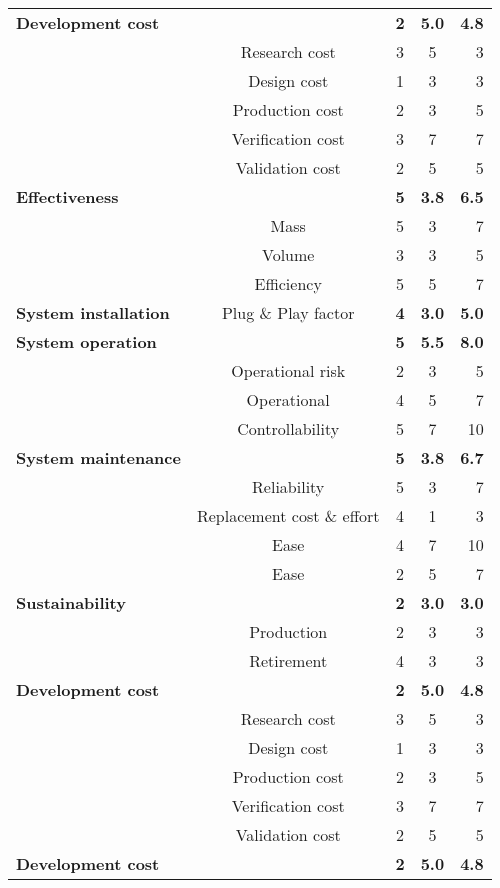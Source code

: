 \begin{center}
\begin{scriptsize}
\begin{longtable}[c]{lcccr}
 \textbf{Development cost} & & \textbf{2} & \textbf{5.0} & \textbf{4.8} \\
  & Research cost & 3 & 5 & 3 \\
  & Design cost & 1 & 3 & 3 \\
  & Production cost & 2 & 3 & 5 \\
  & Verification cost & 3 & 7 & 7 \\
  & Validation cost & 2 & 5 & 5 \\ \hline
 \textbf{Effectiveness} & & \textbf{5} & \textbf{3.8} & \textbf{6.5 } \\
  & Mass & 5 & 3 & 7 \\
  & Volume & 3 & 3 & 5 \\
  & Efficiency & 5 & 5 & 7 \\ \hline
 \textbf{System installation} & Plug \& Play factor & \textbf{4} & \textbf{3.0} & \textbf{5.0} \\ \hline
 \textbf{System operation} & & \textbf{5} & \textbf{5.5} & \textbf{8.0} \\
  & Operational risk & 2 & 3 & 5 \\
  & Operational  & 4 & 5 & 7 \\
  & Controllability & 5 & 7 & 10 \\\hline
 \textbf{System maintenance} & & \textbf{5} & \textbf{3.8} & \textbf{6.7} \\
  & Reliability & 5 & 3 & 7 \\
  & Replacement cost \& effort & 4 & 1 & 3 \\
  & Ease  & 4 & 7 & 10 \\
  & Ease  & 2 & 5 & 7 \\\hline
 \textbf{Sustainability} & & \textbf{2} & \textbf{3.0} & \textbf{3.0} \\
  & Production & 2 & 3 & 3 \\
  & Retirement & 4 & 3 & 3 \\ \hline
  \textbf{Development cost} & & \textbf{2} & \textbf{5.0} & \textbf{4.8} \\
  & Research cost & 3 & 5 & 3 \\
  & Design cost & 1 & 3 & 3 \\
  & Production cost & 2 & 3 & 5 \\
  & Verification cost & 3 & 7 & 7 \\
  & Validation cost & 2 & 5 & 5 \\ \hline
   \textbf{Development cost} & & \textbf{2} & \textbf{5.0} & \textbf{4.8} \\

\end{longtable}
\end{scriptsize}
\end{center}
